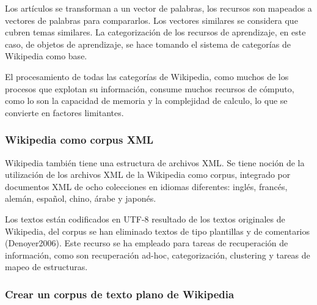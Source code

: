 \documentclass[letterpaper]{article}
\newcommand\textstylebibuscitbase[1]{#1}
\begin{document}
\bigskip

{\sffamily
Los art\'iculos se transforman a un vector de palabras, los recursos son
mapeados a vectores de palabras para compararlos. Los vectores
similares se considera que cubren temas similares. La categorizaci\'on
de los recursos de aprendizaje, en este caso, de objetos de
aprendizaje, se hace tomando el sistema de categor\'ias de Wikipedia
como base.}


\bigskip

{\sffamily
El procesamiento de todas las categor\'ias de Wikipedia, como muchos de
los procesos que explotan su informaci\'on, consume muchos recursos de
c\'omputo, como lo son la capacidad de memoria y la complejidad de
calculo, lo que se convierte en factores limitantes. }

\subsubsection[Wikipedia como corpus XML ]{Wikipedia como corpus XML
\footnotemark{}}
\hypertarget{RefHeading10792782078703}{}

\bigskip

{\sffamily
Wikipedia tambi\'en tiene una estructura de archivos XML. Se tiene
noci\'on de la utilizaci\'on de los archivos XML de la Wikipedia como
corpus, integrado por documentos XML de ocho colecciones en idiomas
diferentes: ingl\'es, franc\'es, alem\'an, espa\~nol, chino, \'arabe y
japon\'es. }

{\sffamily
Los textos est\'an codificados en UTF-8 resultado de los textos
originales de Wikipedia, del corpus se han eliminado textos de tipo
plantillas y de comentarios
\textstylebibuscitbase{(Denoyer2006)}\textstylebibuscitbase{. Este
recurso se ha empleado para tareas de recuperaci\'on de informaci\'on,
como son recuperaci\'on ad-hoc, categorizaci\'on, clustering y tareas
de mapeo de estructuras.}}


\bigskip

\subsubsection[Crear un corpus de texto plano de
Wikipedia]{\textstylebibuscitbase{Crear un
}\textstylebibuscitbase{corpus}\textstylebibuscitbase{ de texto plano
de Wikipedia}}
\hypertarget{RefHeading10794782078703}{}
\bigskip
\end{document}
